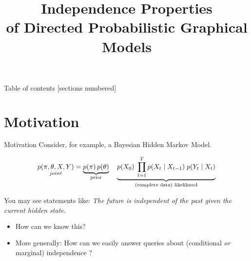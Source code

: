 \documentclass[10pt]{beamer}
\title{Independence Properties \\ of Directed Probabilistic Graphical Models}
\begin{document}
\maketitle

\begin{frame}{Table of contents}
  [sections numbered]
  \tableofcontents[hideallsubsections]
\end{frame}

\section{Motivation}
\begin{frame}{Motivation}
\scriptsize
Consider, for example, a Bayesian Hidden Markov Model.

\[  \underset{joint}{p(\pi, \theta, X, Y)} = \explaintermbrace{prior}{p(\pi) \, p(\theta)} \quad 
\explaintermbrace{(complete data) likelihood}{ p(X_0) \; \ds\prod_{t=1}^T p(X_{t} \cond X_{t-1})  \; p(Y_t \cond X_t)} \]

\pause 

You may see statements like: \textit{The future is independent of the past given the current hidden state.}

\pause
\begin{itemize}
\item How can we know this?
\pause 
\item More generally:  How can we easily answer queries about \tiny (conditional \textit{or} marginal) \scriptsize independence ?
\end{itemize}


\pause 


\end{frame}
\end{document}
